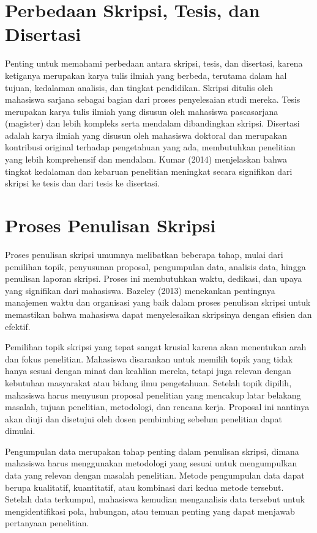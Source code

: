 \documentclass[
  indonesian,
  letterpaper,
]{scrbook}
\begin{document}
\section{Perbedaan Skripsi, Tesis, dan
Disertasi}\label{perbedaan-skripsi-tesis-dan-disertasi}

Penting untuk memahami perbedaan antara skripsi, tesis, dan disertasi,
karena ketiganya merupakan karya tulis ilmiah yang berbeda, terutama
dalam hal tujuan, kedalaman analisis, dan tingkat pendidikan. Skripsi
ditulis oleh mahasiswa sarjana sebagai bagian dari proses penyelesaian
studi mereka. Tesis merupakan karya tulis ilmiah yang disusun oleh
mahasiswa pascasarjana (magister) dan lebih kompleks serta mendalam
dibandingkan skripsi. Disertasi adalah karya ilmiah yang disusun oleh
mahasiswa doktoral dan merupakan kontribusi original terhadap
pengetahuan yang ada, membutuhkan penelitian yang lebih komprehensif dan
mendalam. Kumar (2014) menjelaskan bahwa tingkat kedalaman dan kebaruan
penelitian meningkat secara signifikan dari skripsi ke tesis dan dari
tesis ke disertasi.

\section{Proses Penulisan Skripsi}\label{proses-penulisan-skripsi}

Proses penulisan skripsi umumnya melibatkan beberapa tahap, mulai dari
pemilihan topik, penyusunan proposal, pengumpulan data, analisis data,
hingga penulisan laporan skripsi. Proses ini membutuhkan waktu,
dedikasi, dan upaya yang signifikan dari mahasiswa. Bazeley (2013)
menekankan pentingnya manajemen waktu dan organisasi yang baik dalam
proses penulisan skripsi untuk memastikan bahwa mahasiswa dapat
menyelesaikan skripsinya dengan efisien dan efektif.

Pemilihan topik skripsi yang tepat sangat krusial karena akan menentukan
arah dan fokus penelitian. Mahasiswa disarankan untuk memilih topik yang
tidak hanya sesuai dengan minat dan keahlian mereka, tetapi juga relevan
dengan kebutuhan masyarakat atau bidang ilmu pengetahuan. Setelah topik
dipilih, mahasiswa harus menyusun proposal penelitian yang mencakup
latar belakang masalah, tujuan penelitian, metodologi, dan rencana
kerja. Proposal ini nantinya akan diuji dan disetujui oleh dosen
pembimbing sebelum penelitian dapat dimulai.

Pengumpulan data merupakan tahap penting dalam penulisan skripsi, dimana
mahasiswa harus menggunakan metodologi yang sesuai untuk mengumpulkan
data yang relevan dengan masalah penelitian. Metode pengumpulan data
dapat berupa kualitatif, kuantitatif, atau kombinasi dari kedua metode
tersebut. Setelah data terkumpul, mahasiswa kemudian menganalisis data
tersebut untuk mengidentifikasi pola, hubungan, atau temuan penting yang
dapat menjawab pertanyaan penelitian.
\end{document}
